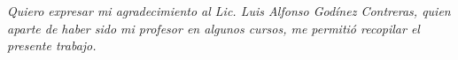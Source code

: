\newpage
\,

\newpage

\restoregeometry%

~\vfill\hfill\begin{minipage}[l]{0.75\textwidth}
     \selectfont\cabin\itshape Quiero expresar mi agradecimiento al Lic. Luis Alfonso Godínez Contreras, quien aparte de haber sido mi profesor en algunos cursos, me permitió recopilar el presente trabajo.
\end{minipage}

\newpage
\,